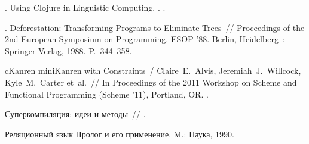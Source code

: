 \begin{thebibliography}{10}
  . Using Clojure in
    Linguistic Computing. \BibDash
  . .

  . Deforestation: Transforming Programs to Eliminate
    Trees~// Proceedings of the 2nd European Symposium on Programming. \BibDash
  \newblock ESOP ’88. \BibDash
  \newblock Berlin, Heidelberg~: Springer-Verlag, 1988. \BibDash
  \newblock P.~344–358.

  cKanren miniKanren with Constraints~/ Claire~E.~Alvis, Jeremiah~J.~Willcock,
    Kyle~M.~Carter et~al.~// In Proceedings of the 2011 Workshop on Scheme and
    Functional Programming (Scheme '11), Portland, OR. \BibDash
  .

   Суперкомпиляция: идеи
    и методы~//  \BibDash
  .

   Реляционный язык Пролог и
    его применение. \BibDash
  \newblock M.: Наука, 1990.

  \end{thebibliography}
